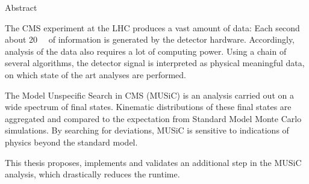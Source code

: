 
{Abstract}
\chapterheadendvskip

The CMS experiment at the LHC produces a vast amount of data: Each second about \SI{20}{\tera\byte} of information is generated by the detector hardware. Accordingly, analysis of the data also requires a lot of computing power. Using a chain of several algorithms, the detector signal is interpreted as physical meaningful data, on which state of the art analyses are performed. 

The Model Unspecific Search in CMS (MUSiC) is an analysis carried out on a wide spectrum of final states. Kinematic distributions of these final states are aggregated and compared to the expectation from Standard Model Monte Carlo simulations. By searching for deviations, MUSiC is sensitive to indications of physics beyond the standard model.

This thesis proposes, implements and validates an additional step in the MUSiC analysis, which drastically reduces the runtime.
